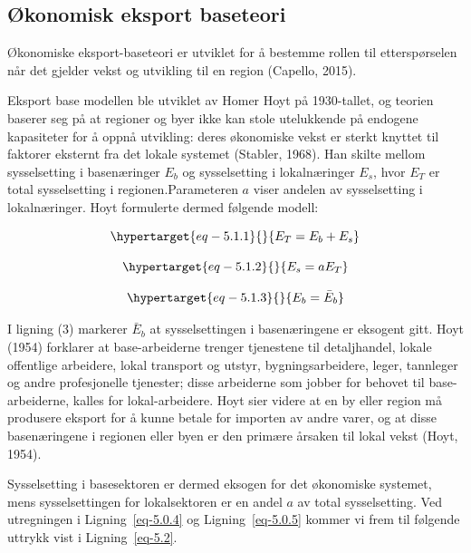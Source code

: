 \documentclass[
]{article}
\begin{document}
\hypertarget{uxf8konomisk-eksport-baseteori}{%
\subsection{Økonomisk eksport
baseteori}\label{uxf8konomisk-eksport-baseteori}}

Økonomiske eksport-baseteori er utviklet for å bestemme rollen til
etterspørselen når det gjelder vekst og utvikling til en region
(Capello, 2015).

Eksport base modellen ble utviklet av Homer Hoyt på 1930-tallet, og
teorien baserer seg på at regioner og byer ikke kan stole utelukkende på
endogene kapasiteter for å oppnå utvikling: deres økonomiske vekst er
sterkt knyttet til faktorer eksternt fra det lokale systemet (Stabler,
1968). Han skilte mellom sysselsetting i basenæringer \(E_b\) og
sysselsetting i lokalnæringer \(E_s\), hvor \(E_T\) er total
sysselsetting i regionen.Parameteren \(a\) viser andelen av
sysselsetting i lokalnæringer. Hoyt formulerte dermed følgende modell:

\begin{equation}\protect\hypertarget{eq-5.1.1}{}{
E_T = E_b + E_s
}\label{eq-5.1.1}\end{equation}

\begin{equation}\protect\hypertarget{eq-5.1.2}{}{
E_s = aE_T
}\label{eq-5.1.2}\end{equation}

\begin{equation}\protect\hypertarget{eq-5.1.3}{}{
E_b = \bar{E}_b
}\label{eq-5.1.3}\end{equation}

I ligning (3) markerer \(\bar{E}_b\) at sysselsettingen i basenæringene
er eksogent gitt. Hoyt (1954) forklarer at base-arbeiderne trenger
tjenestene til detaljhandel, lokale offentlige arbeidere, lokal
transport og utstyr, bygningsarbeidere, leger, tannleger og andre
profesjonelle tjenester; disse arbeiderne som jobber for behovet til
base-arbeiderne, kalles for lokal-arbeidere. Hoyt sier videre at en by
eller region må produsere eksport for å kunne betale for importen av
andre varer, og at disse basenæringene i regionen eller byen er den
primære årsaken til lokal vekst (Hoyt, 1954).

Sysselsetting i basesektoren er dermed eksogen for det økonomiske
systemet, mens sysselsettingen for lokalsektoren er en andel \(a\) av
total sysselsetting. Ved utregningen i Ligning~\ref{eq-5.0.4} og
Ligning~\ref{eq-5.0.5} kommer vi frem til følgende uttrykk vist i
Ligning~\ref{eq-5.2}.
\end{document}
